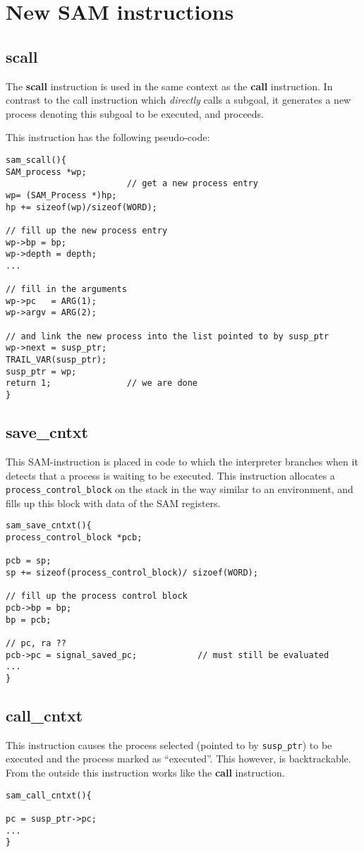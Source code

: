 \section{New SAM instructions}
\subsection{scall}
The {\bf scall} instruction is used in the same context as the {\bf call}
instruction. In contrast to the call instruction which {\em directly\/} calls
a subgoal, it generates a new process denoting this subgoal to be executed,
and proceeds.

This instruction has the following pseudo-code:

\begin{verbatim}
sam_scall(){
SAM_process *wp;
                        // get a new process entry
wp= (SAM_Process *)hp;
hp += sizeof(wp)/sizeof(WORD);

// fill up the new process entry
wp->bp = bp;
wp->depth = depth;
...

// fill in the arguments
wp->pc   = ARG(1);
wp->argv = ARG(2);

// and link the new process into the list pointed to by susp_ptr
wp->next = susp_ptr;
TRAIL_VAR(susp_ptr);
susp_ptr = wp;
return 1;               // we are done
}
\end{verbatim}

\subsection{save\_cntxt}
This SAM-instruction is placed in code to which the interpreter branches
when it detects that a process is waiting to be executed.
This instruction allocates a {\tt process\_control\_block} on the stack
in the way similar to an environment, and fills up this block
with data of the SAM registers.

\begin{verbatim}
sam_save_cntxt(){
process_control_block *pcb;

pcb = sp;
sp += sizeof(process_control_block)/ sizoef(WORD);

// fill up the process control block
pcb->bp = bp;
bp = pcb;

// pc, ra ??
pcb->pc = signal_saved_pc;            // must still be evaluated
...
}
\end{verbatim}

\subsection{call\_cntxt}
This instruction causes the process selected (pointed to by {\tt susp\_ptr})
to be executed and the process marked as ``executed''.
This however, is backtrackable.
From the outside this instruction works like the {\bf call} instruction.
\begin{verbatim}
sam_call_cntxt(){

pc = susp_ptr->pc;
...
}
\end{verbatim}

